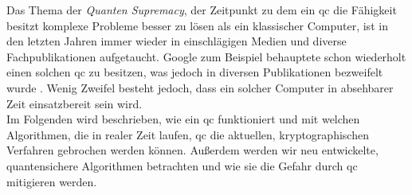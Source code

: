 Das Thema der \textit{Quanten Supremacy}, der Zeitpunkt zu dem ein \ac{qc} die Fähigkeit besitzt komplexe Probleme besser zu lösen als ein klassischer Computer, ist in den letzten Jahren immer wieder in einschlägigen Medien und diverse Fachpublikationen aufgetaucht. Google zum Beispiel behauptete schon wiederholt einen solchen \ac{qc} zu besitzen, was jedoch in diversen Publikationen bezweifelt wurde \cite{cho_ordinary_2022}. Wenig Zweifel besteht jedoch, dass ein solcher Computer in absehbarer Zeit einsatzbereit sein wird.\\ 
Im Folgenden wird beschrieben, wie ein \ac{qc} funktioniert und mit welchen Algorithmen, die in realer Zeit laufen, \ac{qc} die aktuellen, kryptographischen Verfahren gebrochen werden können. Außerdem werden wir neu entwickelte, quantensichere Algorithmen betrachten und wie sie die Gefahr durch \ac{qc} mitigieren werden.